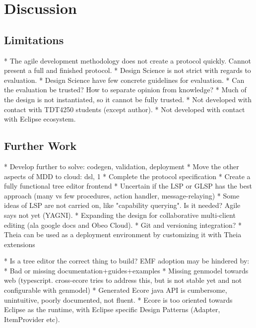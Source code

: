 \chapter{Discussion}\label{chap:discussion}




\section{Limitations}
* The agile development methodology does not create a protocol quickly. Cannot present a full and finished protocol.
* Design Science is not strict with regards to evaluation.
* Design Science have few concrete guidelines for evaluation.
* Can the evaluation be trusted? How to separate opinion from knowledge?
* Much of the design is not instantiated, so it cannot be fully trusted.
* Not developed with contact with \gls{TDT4250} students (except author).
* Not developed with contact with Eclipse ecosystem.


\section{Further Work}

* Develop further to solve: codegen, validation, deployment
* Move the other aspects of MDD to cloud: dsl, 1
* Complete the protocol specification
* Create a fully functional tree editor frontend
* Uncertain if the LSP or GLSP has the best approach (many vs few procedures, action handler, message-relaying)
* Some ideas of LSP are not carried on, like "capability querying". Is it needed? Agile says not yet (YAGNI).
* Expanding the design for collaborative multi-client editing (ala google docs and Obeo Cloud). 
* Git and versioning integration?
* Theia can be used as a deployment environment by customizing it with Theia extensions

* Is a tree editor the correct thing to build? EMF adoption may be hindered by:
  * Bad or missing documentation+guides+examples
  * Missing genmodel towards web (typescript. cross-ecore tries to address this, but is not stable yet and not configurable with genmodel)
  * Generated Ecore java API is cumbersome, unintuitive, poorly documented, not fluent.
  * Ecore is too oriented towards Eclipse as the runtime, with Eclipse specific Design Patterns (Adapter, ItemProvider etc).
